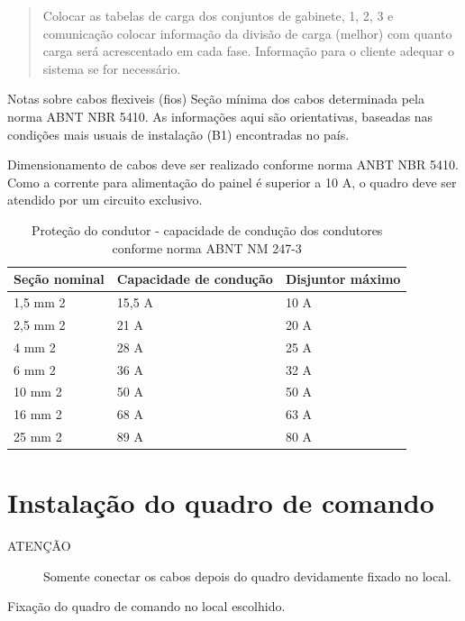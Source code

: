  \begin{quote}
 Colocar as tabelas de carga dos conjuntos de gabinete, 1, 2, 3 e comunicação
 colocar informação da divisão de carga (melhor) com quanto carga será acrescentado em cada  fase. Informação para o cliente adequar o sistema se for necessário.
 \end{quote}

Notas sobre cabos flexiveis (fios)
Seção mínima dos cabos determinada pela norma ABNT NBR 5410. As informações aqui são orientativas, baseadas nas condições mais usuais de instalação (B1) encontradas no país.

Dimensionamento de cabos deve ser realizado conforme norma ANBT NBR 5410. Como a corrente para alimentação do painel é superior a 10 A, o quadro deve ser atendido por um circuito exclusivo.
\begin{table}[htbp]
\caption{Proteção do condutor - capacidade de condução dos condutores conforme norma ABNT NM 247-3}
\begin{tabular}{|l|l|l|}
\hline
Seção nominal &  Capacidade de condução  & Disjuntor máximo \\ \hline
1,5 mm 2  & 15,5 A  & 10 A \\ \hline
2,5 mm 2  & 21 A  & 20 A \\ \hline
4 mm 2  & 28 A  & 25 A \\ \hline
6 mm 2  & 36 A  & 32 A \\ \hline
10 mm 2  & 50 A  & 50 A \\ \hline
16 mm 2  & 68 A  & 63 A \\ \hline
25 mm 2  & 89 A  & 80 A \\ \hline
\end{tabular}
\label{tab:disjuntorcabo}
\end{table}
 


\section{Instalação do quadro de comando}
\begin{description}
\item[ATENÇÃO] Somente conectar os cabos depois do quadro devidamente fixado no local. 
\end{description}

Fixação do quadro de comando no local escolhido. 

